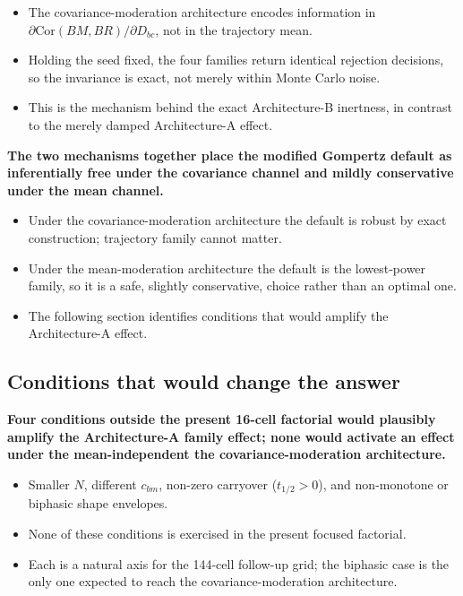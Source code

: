 \documentclass[
  11pt,
]{article}
\newcounter{none} %
\begin{document}
\begin{itemize}\setlength{\itemsep}{2pt}\setlength{\parskip}{0pt}
\item The covariance-moderation architecture encodes information in
  $\partial \mathrm{Cor}(BM, BR)/\partial D_{bc}$, not in
  the trajectory mean.
\item Holding the seed fixed, the four families return identical
  rejection decisions, so the invariance is exact, not merely
  within Monte Carlo noise.
\item This is the mechanism behind the exact Architecture-B
  inertness, in contrast to the merely damped Architecture-A
  effect.
\end{itemize}

\textbf{The two mechanisms together place the modified Gompertz
default as inferentially free under the covariance channel and
mildly conservative under the mean channel.}

\begin{itemize}\setlength{\itemsep}{2pt}\setlength{\parskip}{0pt}
\item Under the covariance-moderation architecture the default is robust by exact
  construction; trajectory family cannot matter.
\item Under the mean-moderation architecture the default is the lowest-power
  family, so it is a safe, slightly conservative, choice rather
  than an optimal one.
\item The following section identifies conditions that would
  amplify the Architecture-A effect.
\end{itemize}

\subsection{Conditions that would change the answer}\label{conditions-that-would-change-the-answer}

\textbf{Four conditions outside the present 16-cell factorial
would plausibly amplify the Architecture-A family effect; none
would activate an effect under the mean-independent the covariance-moderation
architecture.}

\begin{itemize}\setlength{\itemsep}{2pt}\setlength{\parskip}{0pt}
\item Smaller $N$, different $c_{bm}$, non-zero carryover
  ($t_{1/2} > 0$), and non-monotone or biphasic shape
  envelopes.
\item None of these conditions is exercised in the present
  focused factorial.
\item Each is a natural axis for the 144-cell follow-up grid;
  the biphasic case is the only one expected to reach
  the covariance-moderation architecture.
\end{itemize}
\end{document}
